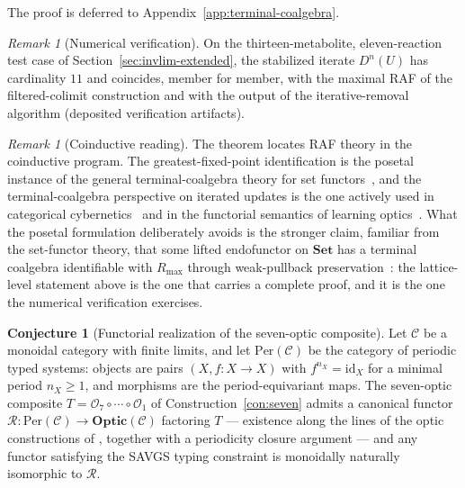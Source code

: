 \documentclass[11pt,a4paper]{article}
\theoremstyle{plain}
\theoremstyle{definition}
\newtheorem{conjecture}[theorem]{Conjecture}
\theoremstyle{remark}
\newtheorem{remark}[theorem]{Remark}
\newcommand{\OO}{\mathcal{O}}
\newcommand{\CC}{\mathcal{C}}
\newcommand{\Optic}{\mathbf{Optic}}
\newcommand{\id}{\mathrm{id}}
\begin{document}
The proof is deferred to Appendix~\ref{app:terminal-coalgebra}.

\begin{remark}[Numerical verification]\label{rem:maxraf-verification}
On the thirteen-metabolite, eleven-reaction test case of
Section~\ref{sec:invlim-extended}, the stabilized iterate
$D^{n}(U)$ has cardinality $11$ and coincides, member for member,
with the maximal RAF of the filtered-colimit construction and
with the output of the iterative-removal algorithm (deposited
verification artifacts).
\end{remark}

\begin{remark}[Coinductive reading]\label{rem:maxraf-community}
The theorem locates RAF theory in the coinductive program. The
greatest-fixed-point identification is the posetal instance of the
general terminal-coalgebra theory for set
functors~\citep{adamek2005,worrell2005}, and the
terminal-coalgebra perspective on iterated updates is the one
actively used in categorical
cybernetics~\citep{hedges2024cybernetics} and in the functorial
semantics of learning optics~\citep{fong2017backprop}. What the
posetal formulation deliberately avoids is the stronger claim,
familiar from the set-functor theory, that some lifted endofunctor
on $\mathbf{Set}$ has a terminal coalgebra identifiable with
$R_{\max}$ through weak-pullback
preservation~\citep{adamek1994,worrell2005}: the lattice-level
statement above is the one that carries a complete proof, and it
is the one the numerical verification exercises.
\end{remark}

\begin{conjecture}[Functorial realization of the seven-optic
composite]\label{conj:functorial-realization}
Let $\CC$ be a monoidal category with finite limits, and let
$\mathrm{Per}(\CC)$ be the category of periodic typed systems:
objects are pairs $(X,f:X\to X)$ with $f^{n_X}=\id_{X}$ for a
minimal period $n_X\geq1$, and morphisms are the
period-equivariant maps. The seven-optic composite
$T=\OO_7\circ\cdots\circ\OO_1$ of Construction~\ref{con:seven}
admits a canonical functor $\mathcal R:\mathrm{Per}(\CC)\to
\Optic(\CC)$ factoring $T$ --- existence along the lines of the
optic constructions of \citealp{riley2018optics}, together with a
periodicity closure argument --- and any functor satisfying the
SAVGS typing constraint is monoidally naturally isomorphic to
$\mathcal R$.
\end{conjecture}
\end{document}
